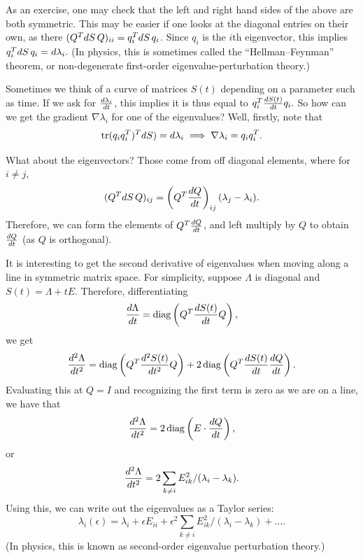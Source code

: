 As an exercise, one may check that the left and right hand sides of the above are both symmetric. This may be easier if one looks at the diagonal entries on their own, as there $(Q^T d S \, Q)_{ii} = q_i^T d S \, q_i$. Since $q_i$ is the $i$th eigenvector, this implies $q_i^T d S\, q_i = d \lambda_i.$   (In physics, this is sometimes called the ``Hellman--Feynman'' theorem, or non-degenerate first-order eigenvalue-perturbation theory.)

Sometimes we think of a curve of matrices $S(t)$ depending on a parameter such as time. If we ask for $\frac{d \lambda_i }{d t}$, this implies it is thus equal to $q_i^T \frac{ d S(t)}{d t} q_i.$ So how can we get the gradient $\nabla \lambda_i$ for one of the eigenvalues? Well, firstly, note that 
\[
\operatorname{tr} (q_i q_i^T)^T d S) = d \lambda_i \implies \nabla \lambda_i = q_i q_i^T.
\]

What about the eigenvectors? Those come from off diagonal elements, where for $i \neq j,$
\[
(Q^T d S \, Q)_{ij} = \left(Q^T \frac{d Q}{
d t}\right)_{ij} (\lambda_j - \lambda_i).
\]
Therefore, we can form the elements of $Q^T \frac{d Q}{ d t}$, and left multiply by $Q$ to obtain $\frac{d Q}{d t}$ (as $Q$ is orthogonal).

It is interesting to get the second derivative of eigenvalues when moving along a line in symmetric matrix space. For simplicity, suppose $\Lambda$ is diagonal and $S(t) = \Lambda + t E.$ Therefore, differentiating
\[
\frac{d \Lambda}{d t} = \operatorname{diag}\left(Q^T \frac{d S(t)}{d t} Q\right),
\]
we get 
\[
\frac{d^2 \Lambda}{d t^2} = \operatorname{diag} \left(Q^T \frac{d^2 S(t)}{d t^2} Q\right) + 2 \operatorname{diag} \left(Q^T \frac{d S(t)}{d t} \frac{d Q}{d t}\right).
\]
Evaluating this at $Q = I$ and recognizing the first term is zero as we are on a line, we have that 
\[
\frac{d^2 \Lambda}{d t^2} = 2 \operatorname{diag} \left(E \cdot  \frac{d Q}{d t}\right),
\]
or 
\[
\frac{d^2 \Lambda}{d t^2} = 2 \sum_{k \neq i} E_{ik}^2/(\lambda_i - \lambda_k).
\]
Using this, we can write out the eigenvalues as a Taylor series: 
\[
\lambda_i (\epsilon) = \lambda_i + \epsilon E_{ii} + \epsilon^2 \sum_{k \neq i} E_{ik}^2/(\lambda_i - \lambda_k) + \dots.
\]
(In physics, this is known as second-order eigenvalue perturbation theory.)